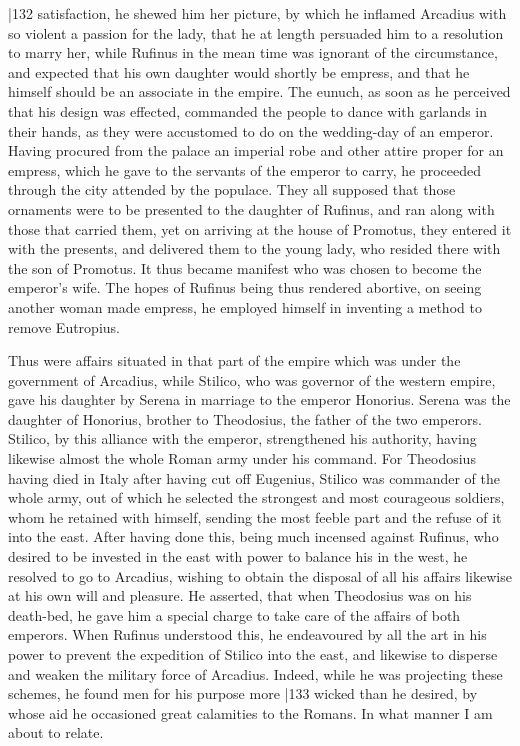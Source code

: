 |132 satisfaction, he shewed him her picture, by which he inflamed Arcadius with so violent a passion for the lady, that he at length persuaded him to a resolution to marry her, while Rufinus in the mean time was ignorant of the circumstance, and expected that his own daughter would shortly be empress, and that he himself should be an associate in the empire. The eunuch, as soon as he perceived that his design was effected, commanded the people to dance with garlands in their hands, as they were accustomed to do on the wedding-day of an emperor. Having procured from the palace an imperial robe and other attire proper for an empress, which he gave to the servants of the emperor to carry, he proceeded through the city attended by the populace. They all supposed that those ornaments were to be presented to the daughter of Rufinus, and ran along with those that carried them, yet on arriving at the house of Promotus, they entered it with the presents, and delivered them to the young lady, who resided there with the son of Promotus. It thus became manifest who was chosen to become the emperor's wife. The hopes of Rufinus being thus rendered abortive, on seeing another woman made empress, he employed himself in inventing a method to remove Eutropius.

Thus were affairs situated in that part of the empire which was under the government of Arcadius, while Stilico, who was governor of the western empire, gave his daughter by Serena in marriage to the emperor Honorius. Serena was the daughter of Honorius, brother to Theodosius, the father of the two emperors. Stilico, by this alliance with the emperor, strengthened his authority, having likewise almost the whole Roman army under his command. For Theodosius having died in Italy after having cut off Eugenius, Stilico was commander of the whole army, out of which he selected the strongest and most courageous soldiers, whom he retained with himself, sending the most feeble part and the refuse of it into the east. After having done this, being much incensed against Rufinus, who desired to be invested in the east with power to balance his in the west, he resolved to go to Arcadius, wishing to obtain the disposal of all his affairs likewise at his own will and pleasure. He asserted, that when Theodosius was on his death-bed, he gave him a special charge to take care of the affairs of both emperors. When Rufinus understood this, he endeavoured by all the art in his power to prevent the expedition of Stilico into the east, and likewise to disperse and weaken the military force of Arcadius. Indeed, while he was projecting these schemes, he found men for his purpose more
|133 wicked than he desired, by whose aid he occasioned great calamities to the Romans. In what manner I am about to relate.

